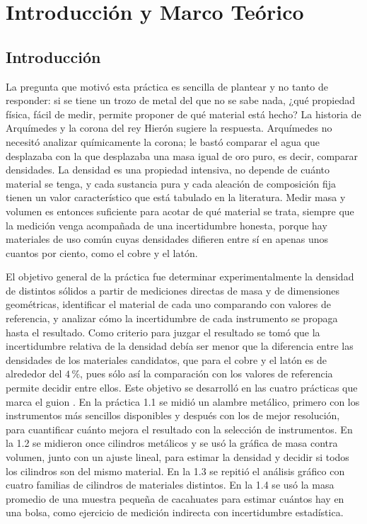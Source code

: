 \section{Introducción y Marco Teórico}

\subsection{Introducción}

La pregunta que motivó esta práctica es sencilla de plantear y no tanto de responder: si se tiene un trozo de metal del que no se sabe nada, ¿qué propiedad física, fácil de medir, permite proponer de qué material está hecho? La historia de Arquímedes y la corona del rey Hierón sugiere la respuesta. Arquímedes no necesitó analizar químicamente la corona; le bastó comparar el agua que desplazaba con la que desplazaba una masa igual de oro puro, es decir, comparar densidades. La densidad es una propiedad intensiva, no depende de cuánto material se tenga, y cada sustancia pura y cada aleación de composición fija tienen un valor característico que está tabulado en la literatura. Medir masa y volumen es entonces suficiente para acotar de qué material se trata, siempre que la medición venga acompañada de una incertidumbre honesta, porque hay materiales de uso común cuyas densidades difieren entre sí en apenas unos cuantos por ciento, como el cobre y el latón.

El objetivo general de la práctica fue determinar experimentalmente la densidad de distintos sólidos a partir de mediciones directas de masa y de dimensiones geométricas, identificar el material de cada uno comparando con valores de referencia, y analizar cómo la incertidumbre de cada instrumento se propaga hasta el resultado. Como criterio para juzgar el resultado se tomó que la incertidumbre relativa de la densidad debía ser menor que la diferencia entre las densidades de los materiales candidatos, que para el cobre y el latón es de alrededor del $4\,\%$, pues sólo así la comparación con los valores de referencia permite decidir entre ellos. Este objetivo se desarrolló en las cuatro prácticas que marca el guion \cite{practica}. En la práctica 1.1 se midió un alambre metálico, primero con los instrumentos más sencillos disponibles y después con los de mejor resolución, para cuantificar cuánto mejora el resultado con la selección de instrumentos. En la 1.2 se midieron once cilindros metálicos y se usó la gráfica de masa contra volumen, junto con un ajuste lineal, para estimar la densidad y decidir si todos los cilindros son del mismo material. En la 1.3 se repitió el análisis gráfico con cuatro familias de cilindros de materiales distintos. En la 1.4 se usó la masa promedio de una muestra pequeña de cacahuates para estimar cuántos hay en una bolsa, como ejercicio de medición indirecta con incertidumbre estadística.

